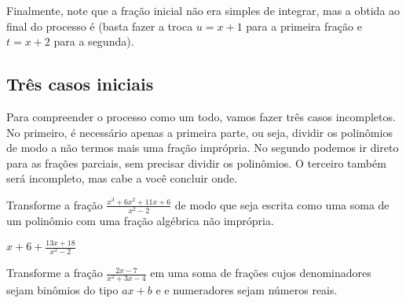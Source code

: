 \documentclass[main_estudante.tex]{subfiles}
\begin{document}
Finalmente, note que a fração inicial não era simples de integrar, mas a obtida ao final do processo é (basta fazer a troca $u=x+1$ para a primeira fração e $t=x+2$ para a segunda).

\subsection*{Três casos iniciais}


Para compreender o processo como um todo, vamos fazer três casos incompletos. No primeiro, é necessário apenas a primeira parte, ou seja, dividir os polinômios de modo a não termos mais uma fração imprópria. No segundo podemos ir direto para as frações parciais, sem precisar dividir os polinômios. O terceiro também será incompleto, mas cabe a você concluir onde.


\begin{questao}
Transforme a fração $\frac{x^3+6x^2+11x+6}{x^2-2}$ de modo que seja escrita como uma soma de um polinômio com uma fração algébrica não imprópria.
\end{questao}

\begin{gabarito}
	\begin{gabaritoQuestao}
		$x+6 + \frac{13x+18}{x^2-2}$
	\end{gabaritoQuestao}
\end{gabarito}


\begin{questao}
Transforme a fração $\frac{2x-7}{x^2+3x-4}$ em uma soma de frações cujos denominadores sejam binômios do tipo $ax+b$ e e numeradores sejam números reais.
\end{questao}
\end{document}
